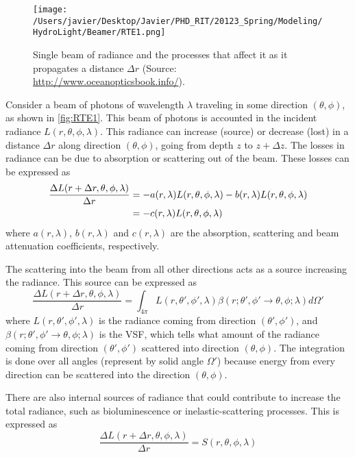 \begin{figure}[htb]
\centering
      \texttt{[image: /Users/javier/Desktop/Javier/PHD\_RIT/20123\_Spring/Modeling/HydroLight/Beamer/RTE1.png]}
      \caption{Single beam of radiance and the processes that affect it as it propagates a distance $\Delta r$ (Source: \protect\url{http://www.oceanopticsbook.info/}).}
      \label{fig:RTE1}
\end{figure}

Consider a beam of photons of wavelength $\lambda$ traveling in some direction $(\theta,\phi)$, as shown in \autoref{fig:RTE1}. This beam of photons is accounted in the incident radiance $L(r,\theta,\phi,\lambda)$. This radiance can increase (source) or decrease (lost) in a distance $\Delta r$ along direction  $(\theta,\phi)$, going from depth $z$ to $z+\Delta z$. The losses in radiance can be due to absorption or scattering out of the beam. These losses can be expressed as
\begin{align}\label{eq:RTE1}
  \frac{\Delta L(r+\Delta r,\theta,\phi,\lambda)}{\Delta r}&= -a(r,\lambda)L(r,\theta,\phi,\lambda)-b(r,\lambda)L(r,\theta,\phi,\lambda)\notag\\ 
  &= -c(r,\lambda)L(r,\theta,\phi,\lambda) 
\end{align}
where $a(r,\lambda)$, $b(r,\lambda)$ and $c(r,\lambda)$ are the absorption, scattering and beam attenuation coefficients, respectively. 

The scattering into the beam from all other directions acts as a source increasing the radiance. This source can be expressed as
\begin{equation}\label{eq:RTE2}
\frac{\Delta L(r+\Delta r,\theta,\phi,\lambda)}{\Delta r} = \int_{4\pi} L(r,\theta',\phi',\lambda)\beta(r;\theta',\phi' \to \theta,\phi;\lambda)d\Omega'
\end{equation}
where $L(r,\theta',\phi',\lambda)$ is the radiance coming from direction $(\theta',\phi')$, and $\beta(r;\theta',\phi' \to \theta,\phi;\lambda)$ is the VSF, which tells what amount of the radiance coming from direction $(\theta',\phi')$ scattered into direction $(\theta,\phi)$. The integration is done over all angles (represent by solid angle $\Omega'$) because energy from every direction can be scattered into the direction $(\theta,\phi)$.

There are also internal sources of radiance that could contribute to increase the total radiance, such as bioluminescence or inelastic-scattering processes. This is expressed as
\begin{equation}\label{eq:RTE3}
    \frac{\Delta L(r+\Delta r,\theta,\phi,\lambda)}{\Delta r} = S(r,\theta,\phi,\lambda)
\end{equation}

